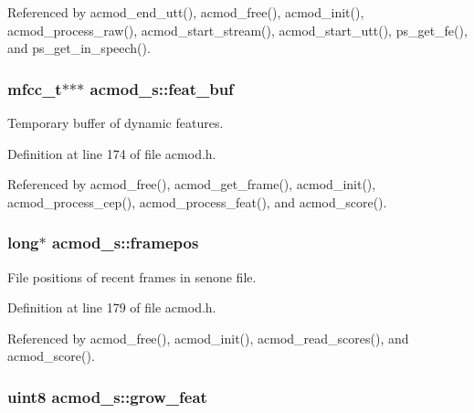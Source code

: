 Referenced by acmod\+\_\+end\+\_\+utt(), acmod\+\_\+free(), acmod\+\_\+init(), acmod\+\_\+process\+\_\+raw(), acmod\+\_\+start\+\_\+stream(), acmod\+\_\+start\+\_\+utt(), ps\+\_\+get\+\_\+fe(), and ps\+\_\+get\+\_\+in\+\_\+speech().

\subsubsection[{feat\+\_\+buf}]{\setlength{\rightskip}{0pt plus 5cm}mfcc\+\_\+t$\ast$$\ast$$\ast$ acmod\+\_\+s\+::feat\+\_\+buf}\label{structacmod__s_afc52cc0151f6c7e32a230576141d20a3}


Temporary buffer of dynamic features. 



Definition at line 174 of file acmod.\+h.



Referenced by acmod\+\_\+free(), acmod\+\_\+get\+\_\+frame(), acmod\+\_\+init(), acmod\+\_\+process\+\_\+cep(), acmod\+\_\+process\+\_\+feat(), and acmod\+\_\+score().

\subsubsection[{framepos}]{\setlength{\rightskip}{0pt plus 5cm}long$\ast$ acmod\+\_\+s\+::framepos}\label{structacmod__s_abfd364dafee513f523e1566bb706e48b}


File positions of recent frames in senone file. 



Definition at line 179 of file acmod.\+h.



Referenced by acmod\+\_\+free(), acmod\+\_\+init(), acmod\+\_\+read\+\_\+scores(), and acmod\+\_\+score().

\subsubsection[{grow\+\_\+feat}]{\setlength{\rightskip}{0pt plus 5cm}uint8 acmod\+\_\+s\+::grow\+\_\+feat}\label{structacmod__s_acbb3fed9495e7b80da79cb03ff3079a1}


